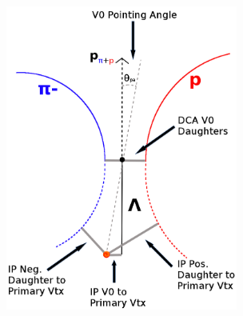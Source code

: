 \begin{figure}[h]
\begin{minipage}{18pc}
\includegraphics[width=18pc]{3_DataSelection/Figures/V0Cuts.png}
\end{minipage}\hspace{2pc}
\begin{minipage}{18pc}

\end{minipage}
\end{figure}
